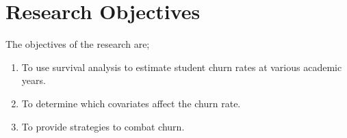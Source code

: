 \documentclass[doublespacing,12pt]{report}
\begin{document}
\section{Research Objectives}
The objectives of the research are;
\begin{enumerate}
\item To use survival analysis to estimate student churn rates at various academic years.
\item To determine which covariates affect the churn rate.
\item To provide strategies to combat churn.
\end{enumerate}
%	

\end{document}

